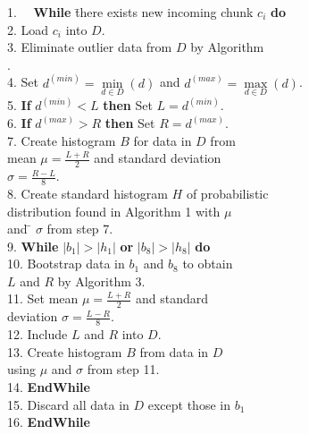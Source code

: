 \documentclass[a4paper,fleqn]{cas-dc}
\begin{document}
\begin{tabbing}
1.~~ \= {\bf While} \= there exists new incoming chunk $c_{i}$ {\bf do} \\
2.   \>             \> Load $c_{i}$ into $D$. \\
3.   \>             \> Eliminate outlier data from $D$ by Algorithm \\
     \>             . \\
4.   \>             \> Set $d^{(min)} = \min\limits_{d \in D}(d)$ and $d^{(max)} = 
                       \max\limits_{d \in D}(d)$. \\
5.   \>             \> {\bf If} $d^{(min)} < L$ {\bf then} Set $L = d^{(min)}$. \\
6.   \>             \> {\bf If} $d^{(max)} > R$ {\bf then} Set $R = d^{(max)}$. \\
7.   \>             \> Create histogram $B$ for data in $D$ from \\
     \>             \> mean $\mu = \frac{L + R}{2}$ and standard deviation \\
     \>             \> $\sigma = \frac{R - L}{8}$. \\
8.   \>             \> Create standard histogram $H$ of probabilistic \\
     \>             \> distribution found in Algorithm 1 with $\mu$ \\
     \>             \> and \= $\sigma$ from step 7. \\
9.   \>             \> {\bf While} $|b_{1}| > |h_{1}|$ {\bf or} $|b_{8}| > |h_{8}|$ {\bf do} \\
10.  \>             \>     \> Bootstrap data in $b_{1}$ and $b_{8}$ to obtain \\
     \>             \>     \> $L$ and $R$ by Algorithm 3. \\
11.  \>             \>     \> Set mean $\mu = \frac{L + R}{2}$ and standard \\
     \>             \>     \> deviation $\sigma = \frac{L - R}{8}$. \\
12.  \>             \>     \> Include $L$ and $R$ into $D$. \\
13.  \>             \>     \> Create histogram $B$ from data in $D$ \\
     \>             \>     \> using $\mu$ and $\sigma$ from step 11. \\
14.  \>             \> {\bf EndWhile} \\
15.  \>             \> Discard all data in $D$ except those in $b_{1}$\\
16.  \> {\bf EndWhile}
\end{tabbing}
\end{document}
